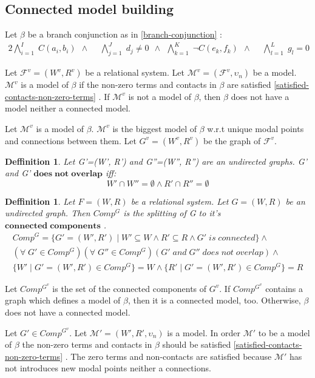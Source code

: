 \documentclass{article}
\newcommand\M{\mathcal{M}}
\newcommand\F{\mathcal{F}}
\newtheorem{defn}[theorem]{Deffinition}
\newcommand{\BranchConjunction}{%
\begin{alignat}{2}
			\bigwedge_{i=1}^{I} \; C(a_i, b_i) \:\: \wedge \:\: &
			\bigwedge_{j=1}^{J} \; d_j \neq 0 \:\: \wedge \:\:
			\bigwedge_{k=1}^{K} \; \neg C(e_k, f_k) \:\: \wedge \:\: &
			\bigwedge_{l=1}^{L} \; g_l = 0 \:\:
\end{alignat}%
}
\begin{document}
	\subsection{Connected model building}

		Let $\beta$ be a branch conjunction as in \ref{branch-conjunction} :
		\nonumber\BranchConjunction

		Let $\F^v = (W^v, R^v)$ be a relational system. Let $\M^v = (\F^v, \upsilon_n)$ be a model. $\M^v$ is a model of $\beta$ if the non-zero terms and contacts in $\beta$ are satisfied \ref{satisfied-contacts-non-zero-terms} .	If $\M^v$ is not a model of $\beta$, then $\beta$ does not have a model neither a connected model.

		Let $\M^v$ is a model of $\beta$. $\M^v$ is the biggest model of $\beta$ w.r.t unique modal points and connections between them. Let $G^v=(W^v, R^v)$ be the graph of $\F^v$.

		\begin{defn}
			Let G'=(W', R') and G''=(W'', R'') are an undirected graphs. G' and G' $\mathbf{does \; not \; overlap}$ iff:
			\begin{equation}
				W' \cap W'' = \emptyset \land R' \cap R'' = \emptyset
			\end{equation}
		\end{defn}

		\begin{defn}
			Let $F = (W, R)$ be a relational system. Let $G = (W, R)$ be an undirected graph. Then $Comp^G$ is the splitting of G to it's $\mathbf{connected \; components}$ .
			\begin{align*}
				Comp^G = \{G'=(W', R') \mid W' \subseteq W \land R' \subseteq R \land G'\;is\;connected \} \land \\
				(\forall \; G' \in Comp^G)(\forall \; G'' \in Comp^G)(G' \; and \; G'' \; does \; not \; overlap) \land \\
				\{ W' \mid G'=(W', R') \in Comp^G \} = W \land \{ R' \mid G'=(W', R') \in Comp^G \} = R
			\end{align*}
		\end{defn}

		Let $Comp^{G^v}$ is the set of the connected components of $G^v$. If $Comp^{G^v}$ contains a graph which defines a model of $\beta$, then it is a connected model, too. Otherwise, $\beta$ does not have a connected model.

		Let $G' \in Comp^{G^v}$. Let $\M' = (W', R', \upsilon_n)$ is a model. In order $\M'$ to be a model of $\beta$ the non-zero terms and contacts in $\beta$ should be satisfied \ref{satisfied-contacts-non-zero-terms} . The zero terms and non-contacts are satisfied because $\M'$ has not introduces new modal points neither a connections.
\end{document}
